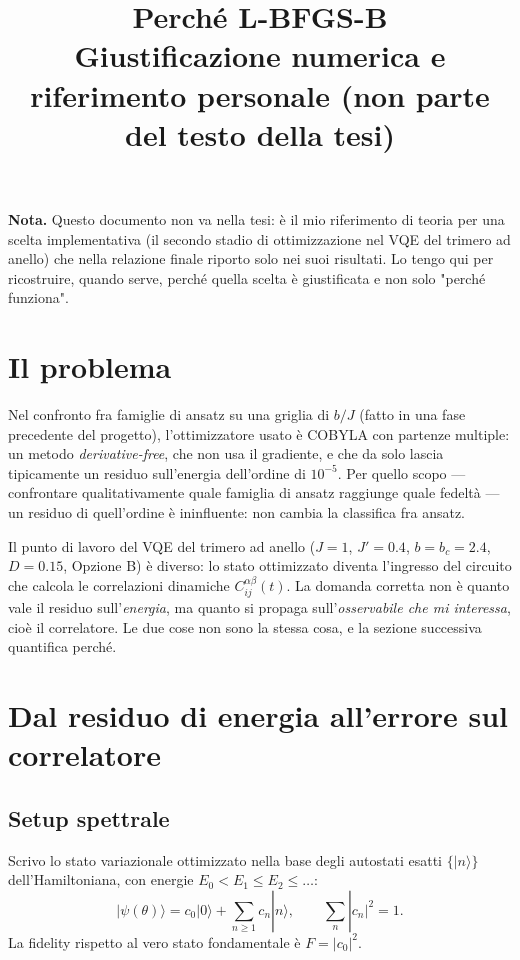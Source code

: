 \documentclass[11pt,a4paper]{article}
\title{Perché L-BFGS-B\\
\large Giustificazione numerica e riferimento personale (non parte del testo della tesi)}
\author{}
\date{}
\begin{document}
\maketitle

\noindent\textbf{Nota.} Questo documento non va nella tesi: è il mio riferimento di teoria per una scelta implementativa (il secondo stadio di ottimizzazione nel VQE del trimero ad anello) che nella relazione finale riporto solo nei suoi risultati. Lo tengo qui per ricostruire, quando serve, perché quella scelta è giustificata e non solo "perché funziona".

\section{Il problema}

Nel confronto fra famiglie di ansatz su una griglia di $b/J$ (fatto in una fase precedente del progetto), l'ottimizzatore usato è COBYLA con partenze multiple: un metodo \emph{derivative-free}, che non usa il gradiente, e che da solo lascia tipicamente un residuo sull'energia dell'ordine di $10^{-5}$. Per quello scopo — confrontare qualitativamente quale famiglia di ansatz raggiunge quale fedeltà — un residuo di quell'ordine è ininfluente: non cambia la classifica fra ansatz.

Il punto di lavoro del VQE del trimero ad anello ($J=1$, $J'=0.4$, $b=b_c=2.4$, $D=0.15$, Opzione B) è diverso: lo stato ottimizzato diventa l'ingresso del circuito che calcola le correlazioni dinamiche $C_{ij}^{\alpha\beta}(t)$. La domanda corretta non è quanto vale il residuo sull'\emph{energia}, ma quanto si propaga sull'\emph{osservabile che mi interessa}, cioè il correlatore. Le due cose non sono la stessa cosa, e la sezione successiva quantifica perché.

\section{Dal residuo di energia all'errore sul correlatore}

\subsection{Setup spettrale}

Scrivo lo stato variazionale ottimizzato nella base degli autostati esatti $\{|n\rangle\}$ dell'Hamiltoniana, con energie $E_0<E_1\le E_2\le\dots$:
\[
|\psi(\theta)\rangle = c_0|0\rangle + \sum_{n\ge1} c_n|n\rangle, \qquad \sum_n|c_n|^2=1.
\]
La fidelity rispetto al vero stato fondamentale è $F=|c_0|^2$.
\end{document}
